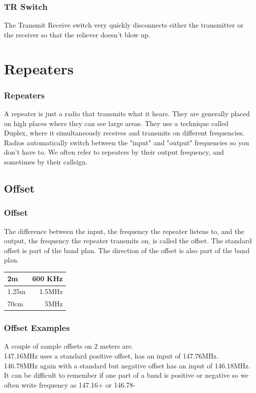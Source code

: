 \documentclass[10pt]{beamer}
\begin{document}
\begin{frame}
\frametitle{TR Switch}
The Transmit Receive switch very quickly disconnects either the transmitter or the receiver so that the reliever doesn't blow up.
\end{frame}

\section{Repeaters}

\begin{frame}
\frametitle{Repeaters}
A repeater is just a radio that transmits what it hears. They are generally placed on high places where they can see large areas. They use a technique called Duplex, where it simultaneously receives and transmits on different frequencies. Radios automatically switch between the "input" and "output" frequencies so you don't have to. We often refer to repeaters by their output frequency, and sometimes by their callsign.
\end{frame}

\subsection{Offset}

\begin{frame}
\frametitle{Offset}
The difference between the input, the frequency the repeater listens to, and the output, the frequency the repeater transmits on, is called the offset. The standard offset is part of the band plan. The direction of the offset is also part of the band plan.\\

\begin{tabular}{|l|r|}
\hline
2m & 600 KHz\\ \hline
1.25m & 1.5MHz \\ \hline
70cm & 5MHz \\
\hline
\end{tabular}

\end{frame}

\begin{frame}
\frametitle{Offset Examples}
A couple of sample offsets on 2 meters are.\\
147.16MHz uses a standard positive offset, has an input of 147.76MHz.\\
146.78MHz again with a standard but negative offset has an input of 146.18MHz.\\
It can be difficult to remember if one part of a band is positive or negative so we often write frequency as 147.16+ or 146.78-
\end{frame}
\end{document}

